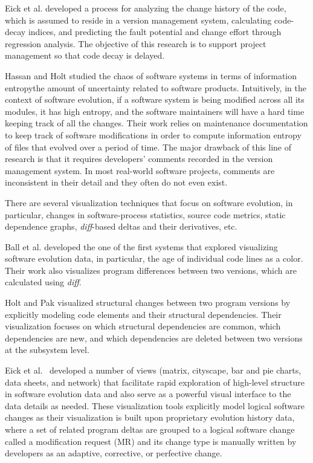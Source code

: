 \documentclass[runningheads,a4paper]{llncs}
\begin{document}
Eick et al. \cite{Eick2001:CodeDecay} developed a process for analyzing the change history of the code, which is assumed to reside in a version management system, calculating code-decay indices, and predicting the fault potential and change effort through regression analysis. The objective of this research is to support project management so that code decay is delayed. 

Hassan and Holt \cite{Hassan2003} studied the chaos of software systems in terms of information entropy\textemdash the amount of uncertainty related to software products. Intuitively, in the context of software evolution, if a software system is being modified across all its modules, it has high entropy, and the software maintainers will have a hard time keeping track of all the changes. Their work relies on maintenance documentation to keep track of software modifications in order to compute information entropy of files that evolved over a period of time. The major drawback of this line of research is that it requires developers' comments recorded in the version management system. In most real-world software projects, comments are inconsistent in their detail and they often do not even exist. 

There are several visualization techniques that focus on software evolution, in particular, changes in software-process statistics, source code metrics, static dependence graphs, {\it diff}-based deltas and their derivatives, etc. 

Ball et al. \cite{Ball1996} developed the one of the first systems that \cite{Ball1996} explored visualizing software evolution data, in particular, the age of individual code lines as a color. Their work also visualizes program differences between two versions, which are calculated using {\it diff}.

Holt and Pak \cite{Holt1996} visualized structural changes between two program versions by explicitly modeling code elements and their structural dependencies. Their visualization focuses on which structural dependencies are common, which dependencies are new, and which dependencies are deleted between two versions at the subsystem level. 


Eick et al.~\cite{Eick2002} developed a number of views (matrix, cityscape, bar and pie charts, data sheets, and network) that facilitate rapid exploration of high-level structure in software evolution data and also serve as a powerful visual interface to the data details as needed. These visualization tools explicitly model logical software changes as their visualization is built upon proprietary evolution history data, where a set of related program deltas are grouped to a logical software change called a modification request (MR) and its change type is manually written by developers as an adaptive, corrective, or perfective change. 
\end{document}
